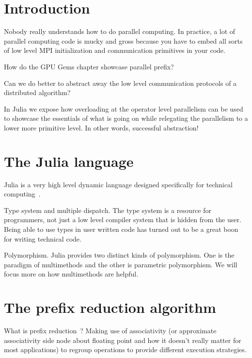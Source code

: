 \documentclass{sig-alternate}
\begin{document}



\section{Introduction}
Nobody really understands how to do parallel computing. In practice, a lot of parallel computing code is mucky and gross because you have to embed all sorts of low level MPI initialization and communication primitives in your code.

How do the GPU Gems chapter showcase parallel prefix?

Can we do better to abstract away the low level communication protocols of a distributed algorithm?

In Julia we expose how overloading at the operator level parallelism can be used to showcase the essentials of what is going on while relegating the parallelism to a lower more primitive level. In other words, successful abstraction!

\section{The Julia language}

Julia is a very high level dynamic language designed specifically for technical computing~\cite{Bezanson2012}.

Type system and multiple dispatch. The type system is a resource for programmers, not just a low level compiler system that is hidden from the user. Being able to use types in user written code has turned out to be a great boon for writing technical code.

Polymorphism. Julia provides two distinct kinds of polymorphism. One is the paradigm of multimethods and the other is parametric polymorphism. We will focus more on how multimethods are helpful.

\section{The prefix reduction algorithm}
\label{sec:prefix}

What is prefix reduction~\cite{Iverson1962,Ladner1980,Brent1982}? Making use of associativity (or approximate associativity side node about floating point and how it doesn't really matter for most applications)  to regroup operations to provide different execution strategies.
\end{document}

